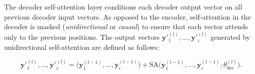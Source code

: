 The decoder self-attention layer conditions each decoder output vector on all previous decoder input vectors. As opposed to the encoder, self-attention in the decoder is masked (\textit{unidirectional} or \textit{causal}) to ensure that each vector attends only to the previous positions. The output vectors $\bm{y}'^{(l)}_1, \ldots, \bm{y}'^{(l)}_i$ generated by unidirectional self-attention are defined as follows:



\begin{equation}
        \bm{y}'^{(l)}_1, \ldots, \bm{y}'^{(l)}_{i} = \bigl(\bm{y}^{(l-1)}_1, \ldots, \bm{y}^{(l-1)}_{i}\bigr) + \textrm{SA}\bigl(\bm{y}^{(l-1)}_1, \ldots, \bm{y}^{(l-1)}_{i}; \theta^{(l)}_{\textrm{dec}}\bigr).
\end{equation}





